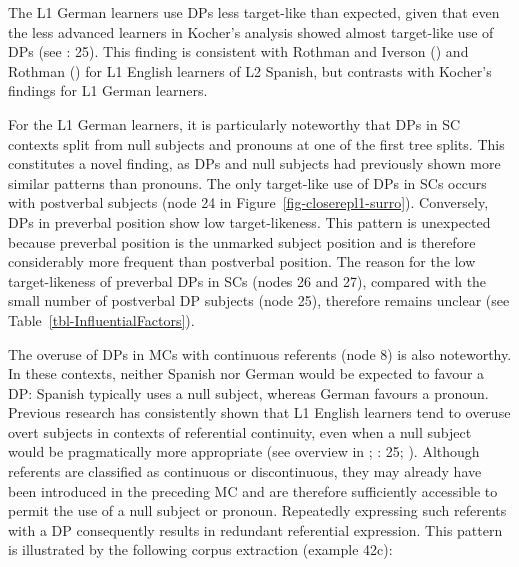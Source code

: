 \documentclass[
  letterpaper,
  DIV=11,
  numbers=noendperiod]{scrartcl}
\begin{document}
The L1 German learners use DPs less target-like than expected, given
that even the less advanced learners in Kocher's analysis showed almost
target-like use of DPs (see : 25). This finding is consistent with Rothman and Iverson
() and Rothman
() for L1 English learners of
L2 Spanish, but contrasts with Kocher's findings for L1 German learners.

For the L1 German learners, it is particularly noteworthy that DPs in SC
contexts split from null subjects and pronouns at one of the first tree
splits. This constitutes a novel finding, as DPs and null subjects had
previously shown more similar patterns than pronouns. The only
target-like use of DPs in SCs occurs with postverbal subjects (node 24
in Figure~\ref{fig-closerepl1-surro}). Conversely, DPs in preverbal
position show low target-likeness. This pattern is unexpected because
preverbal position is the unmarked subject position and is therefore
considerably more frequent than postverbal position. The reason for the
low target-likeness of preverbal DPs in SCs (nodes 26 and 27), compared
with the small number of postverbal DP subjects (node 25), therefore
remains unclear (see Table~\ref{tbl-InfluentialFactors}).

The overuse of DPs in MCs with continuous referents (node 8) is also
noteworthy. In these contexts, neither Spanish nor German would be
expected to favour a DP: Spanish typically uses a null subject, whereas
German favours a pronoun. Previous research has consistently shown that
L1 English learners tend to overuse overt subjects in contexts of
referential continuity, even when a null subject would be pragmatically
more appropriate (see overview in
; : 25;
). Although referents are
classified as continuous or discontinuous, they may already have been
introduced in the preceding MC and are therefore sufficiently accessible
to permit the use of a null subject or pronoun. Repeatedly expressing
such referents with a DP consequently results in redundant referential
expression. This pattern is illustrated by the following corpus
extraction (example 42c):
\end{document}
